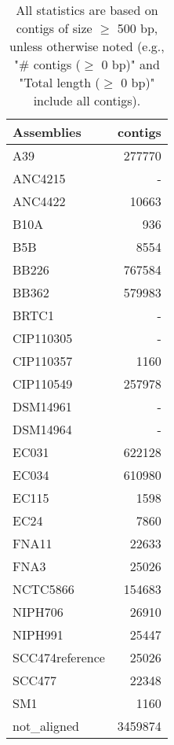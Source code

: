 \documentclass[12pt,a4paper]{article}
\begin{document}
\begin{table}[ht]
\begin{center}
\caption{All statistics are based on contigs of size $\geq$ 500 bp, unless otherwise noted (e.g., "\# contigs ($\geq$ 0 bp)" and "Total length ($\geq$ 0 bp)" include all contigs).}
\begin{tabular}{|l*{1}{|r}|}
\hline
Assemblies & contigs \\ \hline
A39 & 277770 \\ \hline
ANC4215 & - \\ \hline
ANC4422 & 10663 \\ \hline
B10A & 936 \\ \hline
B5B & 8554 \\ \hline
BB226 & 767584 \\ \hline
BB362 & 579983 \\ \hline
BRTC1 & - \\ \hline
CIP110305 & - \\ \hline
CIP110357 & 1160 \\ \hline
CIP110549 & 257978 \\ \hline
DSM14961 & - \\ \hline
DSM14964 & - \\ \hline
EC031 & 622128 \\ \hline
EC034 & 610980 \\ \hline
EC115 & 1598 \\ \hline
EC24 & 7860 \\ \hline
FNA11 & 22633 \\ \hline
FNA3 & 25026 \\ \hline
NCTC5866 & 154683 \\ \hline
NIPH706 & 26910 \\ \hline
NIPH991 & 25447 \\ \hline
SCC474reference & 25026 \\ \hline
SCC477 & 22348 \\ \hline
SM1 & 1160 \\ \hline
not\_aligned & 3459874 \\ \hline
\end{tabular}
\end{center}
\end{table}
\end{document}

